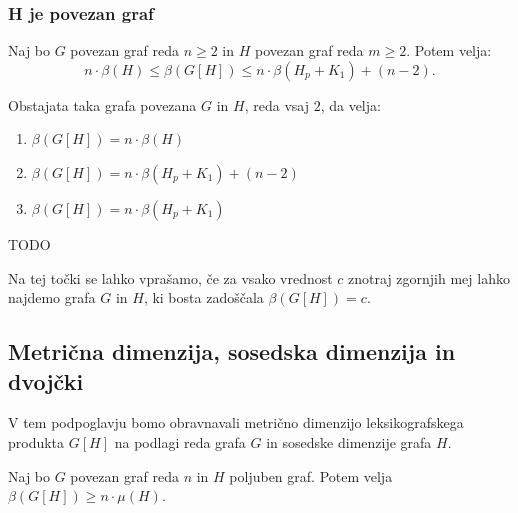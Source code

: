\documentclass[mat1, tisk]{fmfdelo}
\newcommand{\1}{(1, 1, \ldots, 1)}
\newcommand{\2}{(2, 2, \ldots, 2)}
\begin{document}


\subsubsection{H je povezan graf} \label{sss:povzean}


\begin{izrek} \label{izrek:primeri_mdim_komp_povezan}
    Naj bo $G$ povezan graf reda $n \geq 2$ in $H$ povezan graf reda $m \geq 2$. Potem velja:
    $$
    n \cdot \beta(H)  
    \leq \beta(G[H]) \leq 
    n \cdot \beta(H_p + K_1) + (n-2). 
    $$
\end{izrek}

\begin{izrek} \label{izrek:omejitve_mdim_komp_povezan}
    Obstajata taka grafa povezana $G$ in $H$, reda vsaj $2$, da velja:
    \begin{enumerate}
        \item $\beta(G[H]) = n \cdot \beta(H)$
        \item $\beta(G[H]) = n \cdot \beta(H_p + K_1) + (n-2)$
        \item $\beta(G[H]) = n \cdot \beta(H_p + K_1)$
    \end{enumerate}
\end{izrek}
    
\begin{dokaz}
    TODO
\end{dokaz}

Na tej točki se lahko vprašamo, če za vsako vrednost $c$ znotraj zgornjih mej lahko najdemo
grafa $G$ in $H$, ki bosta zadoščala $\beta(G[H]) = c$.



\subsection{Metrična dimenzija, sosedska dimenzija in dvojčki}
V tem podpoglavju bomo obravnavali metrično dimenzijo leksikografskega produkta $G[H]$ na 
podlagi reda grafa $G$ in sosedske dimenzije grafa $H$. 

\begin{lema}
    Naj bo $G$ povezan graf reda $n$ in $H$ poljuben graf. Potem velja
    $\beta(G[H]) \geq n \cdot \mu(H).$
\end{lema}
\end{document}
